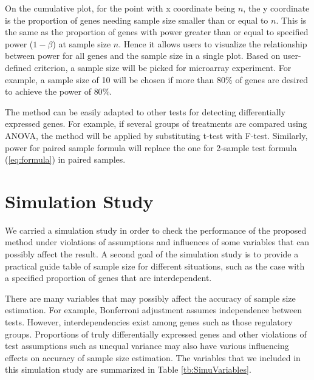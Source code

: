 \documentclass{bioinfo}
\begin{document}
On the cumulative plot, for the point with x coordinate being $n$,
the y coordinate is the proportion of genes needing sample size
smaller than or equal to $n$. This is the same as the proportion
of genes with power greater than or equal to specified power ($1-
\beta$) at sample size $n$. Hence it allows users to visualize the
relationship between power for all genes and the sample size in a
single plot. Based on user-defined criterion, a sample size will
be picked for microarray experiment. For example, a sample size of
10 will be chosen if more than $80\%$ of genes are desired to
achieve the power of $80\%$.

The method can be easily adapted to other tests for detecting
differentially expressed genes. For example, if several groups of
treatments are compared using ANOVA, the method will be applied by
substituting t-test  with F-test. Similarly, power for paired
sample formula will replace the one for 2-sample test formula
(\ref{eq:formula}) in paired samples.


\section{Simulation Study}
We carried a simulation study in order to check the performance of the proposed method under violations of assumptions and
influences of some variables that can possibly affect the result. A second goal of the simulation study is to provide a
practical guide table of sample size for different situations, such as the case with a specified proportion of genes that are
interdependent.

There are many variables that may possibly affect the accuracy of sample size estimation. For example, Bonferroni adjustment
assumes independence between tests. However, interdependencies exist among genes such as those regulatory groups. Proportions
of truly differentially expressed genes and other violations of test assumptions such as unequal variance may also have various
influencing effects on accuracy of sample size estimation. The variables that we included in this simulation study are
summarized in Table \ref{tb:SimuVariables}.
\end{document}
